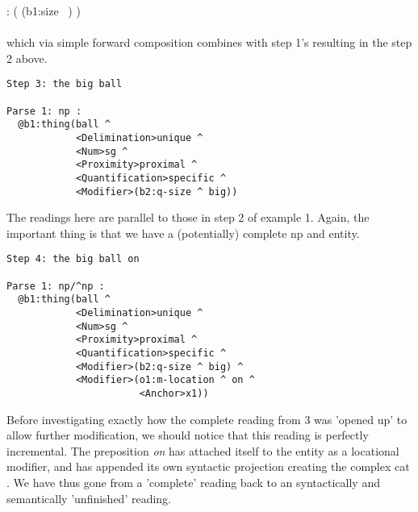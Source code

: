   : (  (b1:size \wand\ ) )\\\\
which via simple forward composition combines with step 1's  resulting in the step 2 above.
\begin{verbatim}
Step 3: the big ball

Parse 1: np : 
  @b1:thing(ball ^ 
            <Delimination>unique ^ 
            <Num>sg ^ 
            <Proximity>proximal ^ 
            <Quantification>specific ^ 
            <Modifier>(b2:q-size ^ big))
\end{verbatim}
The readings here are parallel to those in step 2 of example 1. Again, the important thing is that we have a (potentially) complete np and entity.
\begin{verbatim}
Step 4: the big ball on 

Parse 1: np/^np : 
  @b1:thing(ball ^ 
            <Delimination>unique ^ 
            <Num>sg ^ 
            <Proximity>proximal ^ 
            <Quantification>specific ^ 
            <Modifier>(b2:q-size ^ big) ^ 
            <Modifier>(o1:m-location ^ on ^ 
                       <Anchor>x1))

\end{verbatim}
Before investigating exactly how the complete reading from 3 was 'opened up' to allow further modification, we should notice that this reading is perfectly incremental. The preposition \emph{on} has attached itself to the entity as a locational modifier, and has appended its own syntactic projection creating the complex cat . We have thus gone from a 'complete' reading back to an 
syntactically and semantically 'unfinished' reading.

